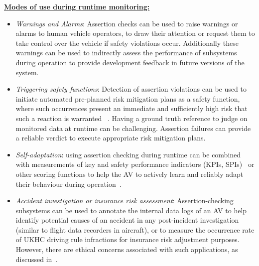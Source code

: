 
\underline{\textbf{Modes of use during runtime monitoring:}}
	
	\begin{itemize}
		\item \emph{Warnings and Alarms}: Assertion checks can be used to raise warnings or alarms to human vehicle operators, to draw their attention or request them to take control over the vehicle if safety violations occur. Additionally these warnings can be used to indirectly assess the performance of subsystems during operation to provide development feedback in future versions of the system.
		
		\item \emph{Triggering safety functions}: Detection of assertion violations can be used to initiate automated pre-planned risk mitigation plans as a safety function, where such occurrences present an immediate and sufficiently high risk that such a reaction is warranted ~\cite{RuntimeReview}. Having a ground truth reference to judge on monitored data at runtime can be challenging. Assertion failures can provide a reliable verdict to execute appropriate risk mitigation plans.
		
		\item \emph{Self-adaptation}: using assertion checking during runtime can be combined with measurements of key and safety performance indicators (KPIs, SPIs)~\cite{Koopman2020} or other scoring functions to help the AV %
		to actively learn and reliably adapt their behaviour during operation~\cite{Kang2020}.
		
		\item \emph{Accident investigation or insurance risk assessment}: Assertion-checking subsystems can be used to annotate the internal data logs of an AV to help identify potential causes of an accident in any post-incident investigation (similar to flight data recorders in aircraft), or to measure the occurrence rate of UKHC driving rule infractions for insurance risk adjustment purposes. However, there are ethical concerns associated with such applications, as discussed in~\cite{EthicalBlackBox}.
		
	\end{itemize}


